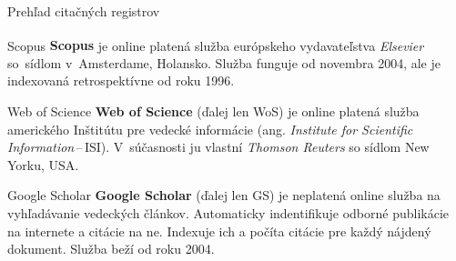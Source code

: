 \documentclass{beamer}
\newcommand{\tm}{\texttrademark}
\newcommand{\R}{\textsuperscript{\textregistered}}
\begin{document}
%
%
\begin{frame}{Prehľad citačných registrov}
  \footnotesize

  \begin{block}{Scopus}
    \textbf{Scopus\R} je online platená služba európskeho vydavateľstva
    \emph{Elsevier} so~sídlom v~Amsterdame, Holansko. Služba funguje od
    novembra 2004, ale je indexovaná retrospektívne od roku 1996.

  \end{block}


  \begin{block}{Web of Science}
    \textbf{Web of Science\tm} (ďalej len WoS) je online platená služba amerického
    Inštitútu pre vedecké informácie (ang. \emph{Institute for Scientific
    Information}\,--\,ISI).  V~súčasnosti ju vlastní \emph{Thomson Reuters}
    so sídlom New Yorku, USA.
  \end{block}


  \begin{block}{Google Scholar}
    \textbf{Google Scholar} (ďalej len GS) je neplatená online služba na
    vyhľadávanie vedeckých článkov. Automaticky indentifikuje odborné
    publikácie na internete a citácie na ne. Indexuje ich a počíta citácie pre
    každý nájdený dokument.  Služba beží od roku 2004.
  \end{block}
\end{frame}

%
%

%
%

%
%
\end{document}
